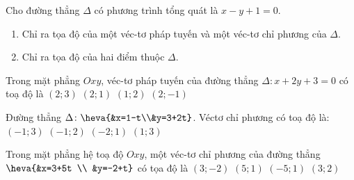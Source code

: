 \begin{bt}%
	Cho đường thẳng $\Delta$ có phương trình tổng quát là $x-y+1=0$.
	\begin{enumerate}
		\item Chỉ ra tọa độ của một véc-tơ pháp tuyến và một véc-tơ chỉ phương của $\Delta$.
		\item Chỉ ra tọa độ của hai điểm thuộc $\Delta$.
	\end{enumerate}
\end{bt}


\begin{ex}%
	Trong mặt phẳng $O x y$, véc-tơ pháp tuyến của đường thẳng $\Delta\colon x+2  y+3=0$ có toạ độ là
	 \choice
		{$(2;  3)$}
		{$(2;  1)$}
		 {\True$(1; 2)$}
		 {$(2;-1)$}
\end{ex}

\begin{ex}%
	Đường  thẳng $\Delta\colon\heva{&x=1-t\\&y=3+2t}$. Véctơ chỉ phương có toạ độ là$\colon$
	 \choice
		{$\left(-1;3\right)$} 
		{\True  $\left(-1;2\right)$}
		{$\left(-2;1\right)$} 
		 {$\left(1;3\right)$}
\end{ex}

\begin{ex}%
	Trong mặt phẳng hệ toạ độ $Oxy$, một véc-tơ chỉ phương của đường thẳng $\heva{&x=3+5t \\ &y=-2+t}$ có tọa độ là 
	\choice 
		{$(3; -2)$} 
		 {\True $(5; 1)$}
		{$(-5;  1)$}
		{$(3;  2)$}
\end{ex}

